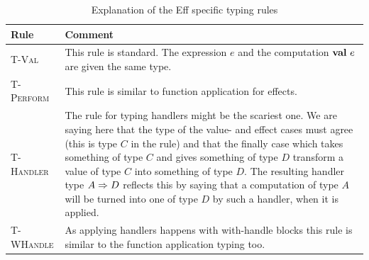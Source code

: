 \documentclass[class=article, crop=false]{standalone}
\begin{document}
\begin{table}
  \small
  \centering
  {\renewcommand{\arraystretch}{1.3}
  \begin{tabularx}{\textwidth}{lX}
  \toprule
  Rule & Comment \\
  \midrule
  \textsc{T-Val} &
    This rule is standard. The expression $e$ and the computation $\mathbf{val}\  e$ are given the same type.\\
  \textsc{T-Perform} &
    This rule is similar to function application for effects.\\
  \textsc{T-Handler} &
    The rule for typing handlers might be the scariest one. We are saying here that
    the type of the value- and effect cases must agree (this is type $C$ in the rule) and that
    the finally case which takes something of type $C$ and gives something of type $D$ transform a
    value of type $C$ into something of type $D$. The resulting handler type $A \Rightarrow D$ reflects
    this by saying that a computation of type $A$ will be turned into one of type $D$ by such a handler, when it
    is applied.\\
  \textsc{T-WHandle} &
    As applying handlers happens with with-handle blocks this rule is similar to
    the function application typing too. \\
  \bottomrule
  \end{tabularx}
  \caption[Eff typing]{Explanation of the Eff specific typing rules}
  \label{tab:typing-rule-explanation}
  }
\end{table}

\lstset{language=efflang}
\end{document}
